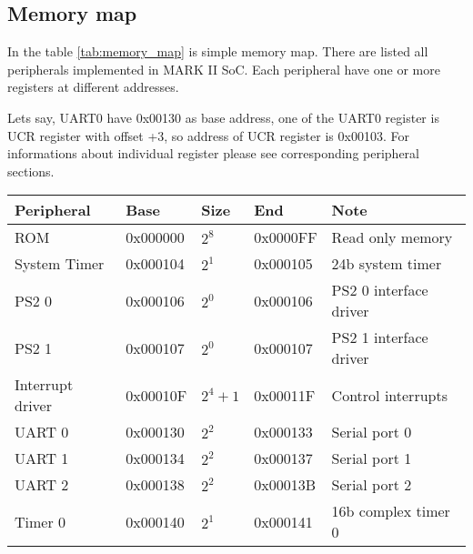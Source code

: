 \subsection{Memory map}

In the table \ref{tab:memory_map} is simple memory map. There are listed all
peripherals implemented in MARK II SoC. Each peripheral have one or more registers at different
addresses.

Lets say, UART0 have 0x00130 as base address, one of the UART0 register
is UCR register with offset +3, so address of UCR register is 0x00103. For
informations about individual register please see corresponding peripheral sections.

\begin{table}[h]
    \centering
    \begin{tabular}{|l|l|l|l|l|}
        \hline
        \textbf{Peripheral} & \textbf{Base} & \textbf{Size} & \textbf{End} & \textbf{Note}                                  \\ \hline
        ROM                 & 0x000000      & $2^{8}$       & 0x0000FF     & Read only memory                               \\ \hline
        System Timer        & 0x000104      & $2^{1}$       & 0x000105     & 24b system timer                               \\ \hline
        PS2 0               & 0x000106      & $2^{0}$       & 0x000106     & PS2 0 interface driver                         \\ \hline
        PS2 1               & 0x000107      & $2^{0}$       & 0x000107     & PS2 1 interface driver                         \\ \hline
        Interrupt driver    & 0x00010F      & $2^{4} + 1$   & 0x00011F     & Control interrupts                             \\ \hline
        UART 0              & 0x000130      & $2^{2}$       & 0x000133     & Serial port 0                                  \\ \hline
        UART 1              & 0x000134      & $2^{2}$       & 0x000137     & Serial port 1                                  \\ \hline
        UART 2              & 0x000138      & $2^{2}$       & 0x00013B     & Serial port 2                                  \\ \hline
        Timer 0             & 0x000140      & $2^{1}$       & 0x000141     & 16b complex timer 0                            \\ \hline

\end{tabular}
\end{table}
